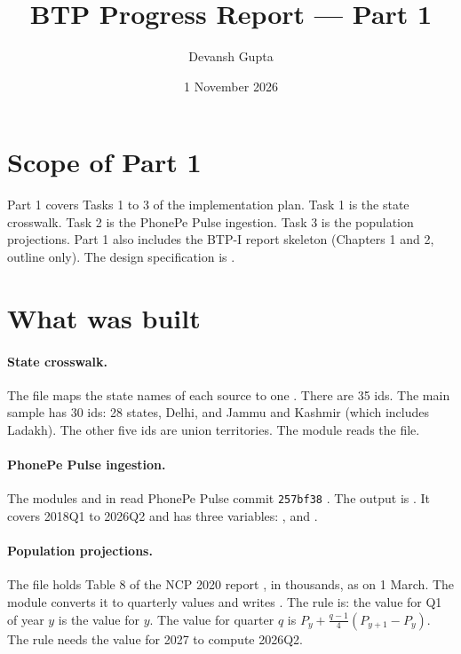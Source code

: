 \documentclass[11pt,a4paper]{article}
\title{BTP Progress Report --- Part 1}
\author{Devansh Gupta}
\date{1 November 2026}
\begin{document}
\maketitle

\section{Scope of Part 1}
Part 1 covers Tasks 1 to 3 of the implementation plan. Task 1 is the state crosswalk. Task 2 is the PhonePe Pulse ingestion. Task 3 is the population projections.
Part 1 also includes the BTP-I report skeleton (Chapters 1 and 2, outline only).
The design specification is .

\section{What was built}
\paragraph{State crosswalk.}
The file  maps the state names of each source to one . There are 35 ids. The main sample has 30 ids: 28 states, Delhi, and Jammu and Kashmir (which includes Ladakh). The other five ids are union territories. The module  reads the file.

\paragraph{PhonePe Pulse ingestion.}
The modules  and  in  read PhonePe Pulse commit \texttt{257bf38} \citep{phonepe_pulse}. The output is . It covers 2018Q1 to 2026Q2 and has three variables: ,  and .

\paragraph{Population projections.}
The file  holds Table 8 of the NCP 2020 report \citep{ncp2020}, in thousands, as on 1 March. The module  converts it to quarterly values and writes . The rule is: the value for Q1 of year $y$ is the value for $y$. The value for quarter $q$ is $P_y + \frac{q-1}{4}(P_{y+1} - P_y)$. The rule needs the value for 2027 to compute 2026Q2.
\end{document}
